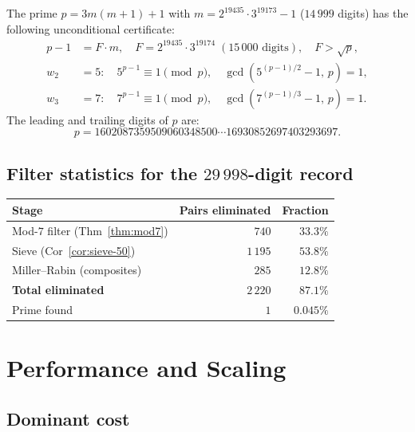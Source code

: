 \documentclass[11pt,a4paper]{article}
\theoremstyle{definition}
\theoremstyle{remark}
\begin{document}
\begin{rigorousbox}
The prime $p = 3m(m+1)+1$ with $m = 2^{19435}\cdot 3^{19173}-1$
($14\,999$ digits) has the following unconditional certificate:
\begin{align*}
  p-1 &= F\cdot m,\quad F = 2^{19435}\cdot 3^{19174}
         \;(15\,000\text{ digits}),\quad F>\sqrt{p}, \\
  w_2 &= 5:\quad 5^{p-1}\equiv 1\pmod{p},\quad
         \gcd(5^{(p-1)/2}-1,\,p)=1, \\
  w_3 &= 7:\quad 7^{p-1}\equiv 1\pmod{p},\quad
         \gcd(7^{(p-1)/3}-1,\,p)=1.
\end{align*}
The leading and trailing digits of $p$ are:
\[
  p = 1602087359509060348500\cdots 16930852697403293697.
\]
\end{rigorousbox}

\subsection{Filter statistics for the $29\,998$-digit record}

\begin{center}
\begin{tabular}{@{}lrr@{}}
\toprule
Stage & Pairs eliminated & Fraction \\
\midrule
Mod-$7$ filter (Thm~\ref{thm:mod7}) & $740$ & $33.3\%$ \\
Sieve (Cor~\ref{cor:sieve-50}) & $1\,195$ & $53.8\%$ \\
Miller--Rabin (composites) & $285$ & $12.8\%$ \\
\midrule
\textbf{Total eliminated} & $2\,220$ & $\mathbf{87.1\%}$ \\
Prime found & $1$ & $0.045\%$ \\
\bottomrule
\end{tabular}
\end{center}

\section{Performance and Scaling}\label{sec:scaling}

\subsection{Dominant cost}
\end{document}
